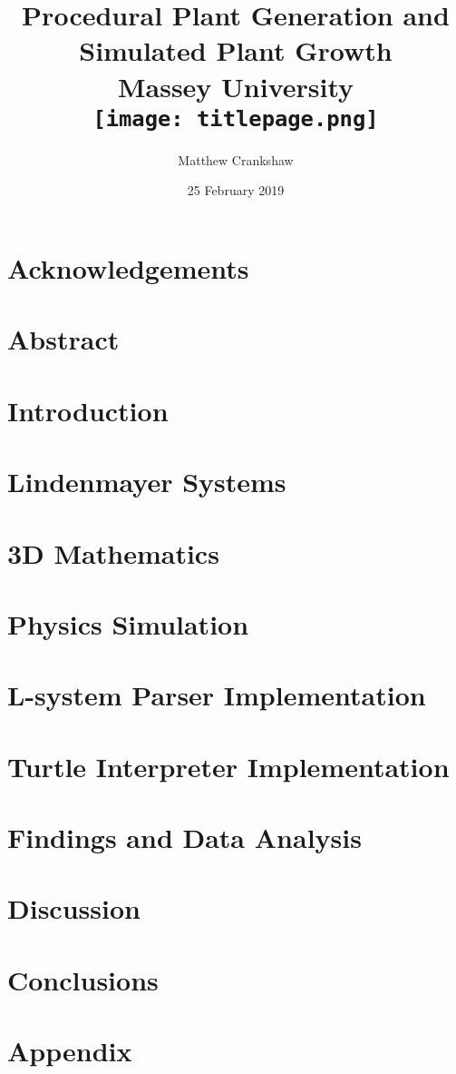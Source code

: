 \documentclass[11pt]{report}
\title{
{ Procedural Plant Generation and Simulated Plant Growth }\\
{\large Massey University}
\\
\vspace{2cm}
{\texttt{[image: titlepage.png]}}
\vspace{2cm}
}
\author{Matthew Crankshaw}
\date{25 February 2019}
\begin{document}
\maketitle

\chapter*{Acknowledgements}

\chapter*{Abstract}

\tableofcontents
\listoffigures


\chapter{Introduction}


\chapter{Lindenmayer Systems}   


\chapter{3D Mathematics}


\chapter{Physics Simulation}


\chapter{L-system Parser Implementation}


\chapter{Turtle Interpreter Implementation}


\chapter{Findings and Data Analysis}


\chapter{Discussion}


\chapter{Conclusions}


\printglossary[type=\acronymtype]
\printglossary

\appendix
\chapter{Appendix}

\end{document}
